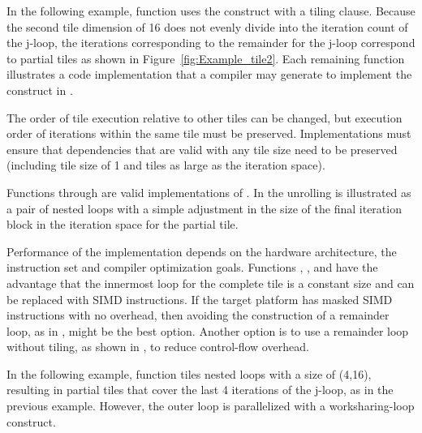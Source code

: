 In the following example, function  uses the  construct
with a  tiling clause.  Because the second tile dimension of
16 does not evenly divide into the iteration count of the j-loop, the
iterations corresponding to the remainder for the j-loop correspond to partial
tiles as shown in Figure~\ref{fig:Example_tile2}. Each remaining function
illustrates a code implementation that a compiler may generate to implement the
 construct in .

The order of tile execution relative to other tiles can be changed, but execution order of 
iterations within the same tile must be preserved.
Implementations must ensure that dependencies that are valid with any tile size need
to be preserved (including tile size of 1 and tiles as large as the iteration space).

Functions  through  are valid implementations of .
In  the unrolling is illustrated as a pair of nested loops with a simple
adjustment in the size of the final iteration block in the  iteration space
for the partial tile.

Performance of the implementation depends on the hardware architecture, the instruction set and compiler optimization goals.
Functions , , and   have the advantage that
the innermost loop for the complete tile is a constant size and can be replaced with SIMD instructions.
If the target platform has masked SIMD instructions with no overhead, then avoiding the construction of a
remainder loop, as in , might be the best option.
Another option is to use a remainder loop without tiling, as shown in , to reduce control-flow overhead.



In the following example, function  tiles nested loops with a size of (4,16),
resulting in partial tiles that cover the last 4 iterations of the j-loop, as
in the previous example.  However, the outer loop is parallelized with a
 worksharing-loop construct.

